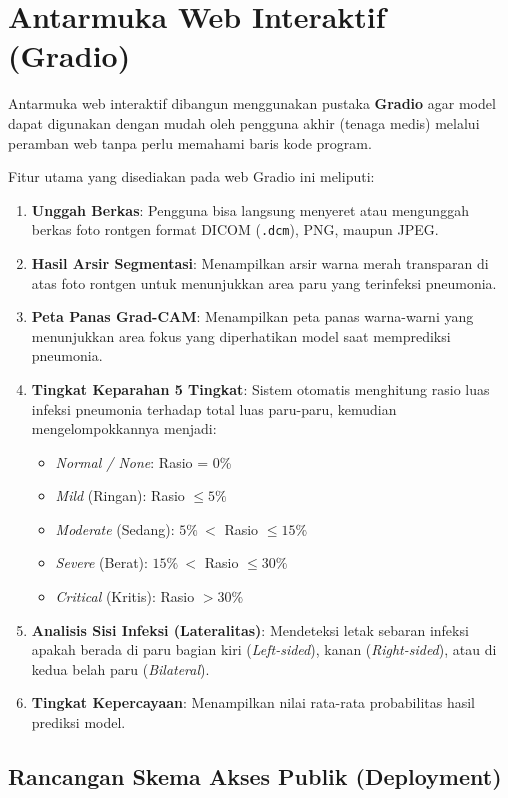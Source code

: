 \documentclass[12pt,a4paper,oneside]{book}
\begin{document}
\section{Antarmuka Web Interaktif (Gradio)}

Antarmuka web interaktif dibangun menggunakan pustaka \textbf{Gradio} agar model dapat digunakan dengan mudah oleh pengguna akhir (tenaga medis) melalui peramban web tanpa perlu memahami baris kode program.

Fitur utama yang disediakan pada web Gradio ini meliputi:
\begin{enumerate}
  \item \textbf{Unggah Berkas}: Pengguna bisa langsung menyeret atau mengunggah berkas foto rontgen format DICOM (\texttt{.dcm}), PNG, maupun JPEG.
  \item \textbf{Hasil Arsir Segmentasi}: Menampilkan arsir warna merah transparan di atas foto rontgen untuk menunjukkan area paru yang terinfeksi pneumonia.
  \item \textbf{Peta Panas Grad-CAM}: Menampilkan peta panas warna-warni yang menunjukkan area fokus yang diperhatikan model saat memprediksi pneumonia.
  \item \textbf{Tingkat Keparahan 5 Tingkat}: Sistem otomatis menghitung rasio luas infeksi pneumonia terhadap total luas paru-paru, kemudian mengelompokkannya menjadi:
  \begin{itemize}
    \item \textit{Normal / None}: Rasio = 0\%
    \item \textit{Mild} (Ringan): Rasio $\le 5\%$
    \item \textit{Moderate} (Sedang): $5\%\ <$ Rasio $\le 15\%$
    \item \textit{Severe} (Berat): $15\%\ <$ Rasio $\le 30\%$
    \item \textit{Critical} (Kritis): Rasio $> 30\%$
  \end{itemize}
  \item \textbf{Analisis Sisi Infeksi (Lateralitas)}: Mendeteksi letak sebaran infeksi apakah berada di paru bagian kiri (\textit{Left-sided}), kanan (\textit{Right-sided}), atau di kedua belah paru (\textit{Bilateral}).
  \item \textbf{Tingkat Kepercayaan}: Menampilkan nilai rata-rata probabilitas hasil prediksi model.
\end{enumerate}
\subsection{Rancangan Skema Akses Publik (Deployment)}
\end{document}
